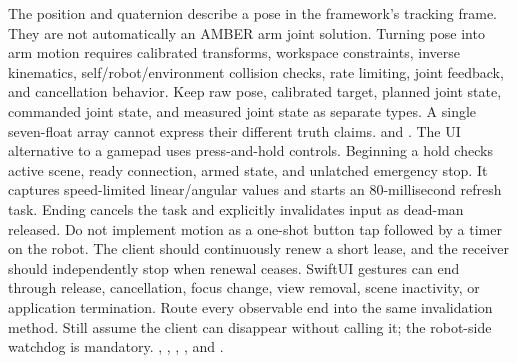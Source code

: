 {}The position and quaternion describe a pose in the framework's tracking frame. They are not automatically an AMBER arm joint solution. Turning pose into arm motion requires calibrated transforms, workspace constraints, inverse kinematics, self/robot/environment collision checks, rate limiting, joint feedback, and cancellation behavior.\markdownRendererParagraphSeparator
{}Keep raw pose, calibrated target, planned joint state, commanded joint state, and measured joint state as separate types. A single seven-float array cannot express their different truth claims.\markdownRendererInterblockSeparator
{}
\markdownRendererSectionEnd \markdownRendererSectionBegin
{}\markdownRendererInterblockSeparator
{}\markdownRendererBlockQuoteBegin
{}  and .\markdownRendererBlockQuoteEnd \markdownRendererInterblockSeparator
{}The UI alternative to a gamepad uses press-and-hold controls. Beginning a hold checks active scene, ready connection, armed state, and unlatched emergency stop. It captures speed-limited linear/angular values and starts an 80-millisecond refresh task. Ending cancels the task and explicitly invalidates input as dead-man released.\markdownRendererParagraphSeparator
{}Do not implement motion as a one-shot button tap followed by a timer on the robot. The client should continuously renew a short lease, and the receiver should independently stop when renewal ceases.\markdownRendererParagraphSeparator
{}SwiftUI gestures can end through release, cancellation, focus change, view removal, scene inactivity, or application termination. Route every observable end into the same invalidation method. Still assume the client can disappear without calling it; the robot-side watchdog is mandatory.\markdownRendererInterblockSeparator
{}
\markdownRendererSectionEnd \markdownRendererSectionBegin
{}\markdownRendererInterblockSeparator
{}\markdownRendererBlockQuoteBegin
{} , , , , and .\markdownRendererBlockQuoteEnd \markdownRendererInterblockSeparator
